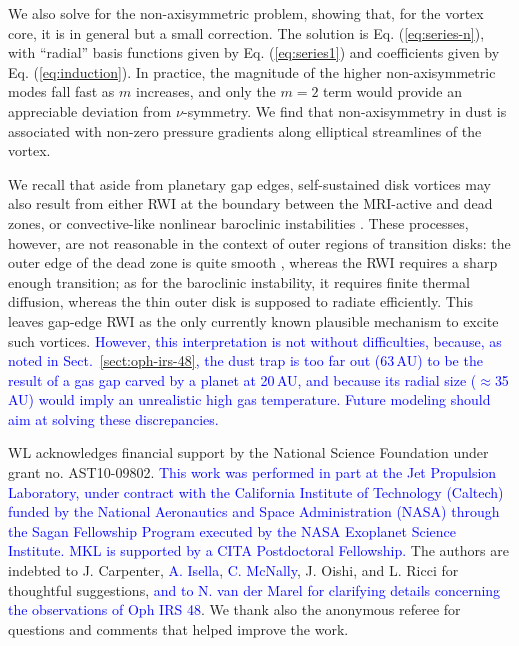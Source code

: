 \documentclass[apj]{emulateapj}
\def\blue#1{\textcolor{blue}{ #1}}
\newcommand{\Eq}[1]{Eq. (\ref{#1})}
\newcommand{\eq}[1]{\Eq{#1}}
\newcommand{\sect}[1]{Sect.~\ref{#1}}
\begin{document}
We also solve for the non-axisymmetric problem, showing that, for the
vortex core, it is in general but a small correction. The solution is
\eq{eq:series-n}, with ``radial'' basis functions given by
\eq{eq:series1} and coefficients given by \eq{eq:induction}. In practice, the magnitude
of the higher non-axisymmetric modes fall fast as $m$ increases, and 
only the $m=2$ term would provide an appreciable deviation from
$\nu$-symmetry. We find that non-axisymmetry in dust 
is associated with non-zero pressure gradients along elliptical streamlines of the vortex.

We recall that aside from planetary gap edges, self-sustained disk
vortices may also result from either RWI at the boundary between the MRI-active
and dead zones, or convective-like nonlinear baroclinic instabilities \citep{Klahr-Bodenheimer03,Klahr04,Petersen07a,Petersen07b,Lesur-Papaloizou10,Lyra-Klahr11,Raettig13}. 
These processes, however, are not reasonable in the context of outer
regions of transition disks: the outer edge of the dead zone is quite smooth
\citep{Dzyurkevich13,Landry13}, whereas the RWI requires a 
sharp enough transition; as for the baroclinic instability, it
requires finite thermal diffusion, whereas the thin outer disk
  is supposed to radiate efficiently. This leaves gap-edge RWI as the only currently known
plausible mechanism to excite such vortices. \blue{However, this interpretation 
is not without difficulties, because, as noted in
\sect{sect:oph-irs-48}, the dust trap is too far out (63\,AU) to be
the result of a gas gap carved by a planet at 20\,AU, and because its
radial size ($\approx$35\,AU) would imply an unrealistic high
gas temperature. Future modeling should aim at solving these discrepancies.}


\acknowledgments WL acknowledges financial support by the National Science
Foundation under grant no. AST10-09802. \blue{This work was performed in part at the Jet Propulsion
Laboratory, under contract with the California Institute of
Technology (Caltech) funded by the National Aeronautics and Space
Administration (NASA) through the Sagan Fellowship Program executed
by the NASA Exoplanet Science Institute. MKL is supported by a CITA Postdoctoral Fellowship.}
The authors are indebted to J. Carpenter, \blue{A. Isella}, \blue{C. McNally}, J. Oishi, and L. Ricci for thoughtful
suggestions, \blue{and to N. van der Marel for clarifying details
concerning the observations of Oph IRS 48}. We thank also the anonymous referee for questions and comments that helped improve the work.
\end{document}
